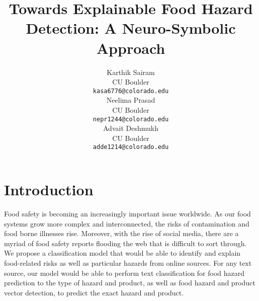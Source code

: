 \documentclass[11pt]{article}
\title{Towards Explainable Food Hazard Detection: A Neuro-Symbolic Approach}
\author{Karthik Sairam \\
  CU Boulder\\
  \texttt{kasa6776@colorado.edu} \\\And
  Neelima Prasad \\
  CU Boulder\\
  \texttt{nepr1244@colorado.edu} \\\And
  Advait Deshmukh \\
  CU Boulder\\
  \texttt{adde1214@colorado.edu} \\}
\begin{document}
\maketitle


\section{Introduction}


Food safety is becoming an increasingly important issue worldwide. As our food systems grow more complex and interconnected, the risks of contamination and food borne illnesses rise. Moreover, with the rise of social media, there are a myriad of food safety reports flooding the web that is difficult to sort through. We propose a classification model that would be able to identify and explain food-related risks as well as particular hazards from online sources. For any text source, our model would be able to perform text classification for food hazard prediction to the type of hazard and product, as well as food hazard and product vector detection, to predict the exact hazard and product.



\end{document}
